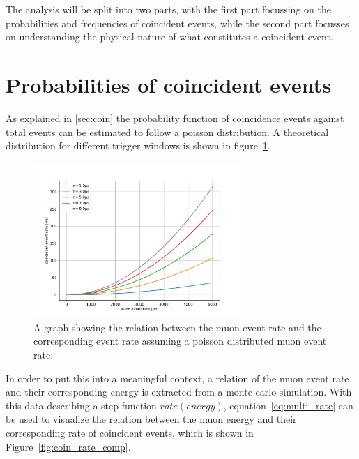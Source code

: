 The analysis will be split into two parts, with the first part focussing on the probabilities and frequencies of coincident events, while the second part 
focusses on understanding the physical nature of what constitutes a coincident event. 

\section{Probabilities of coincident events}

As explained in \ref{sec:coin} the probability function of coincidence events against total events can be estimated to follow a poisson distribution.
A theoretical distribution for different trigger windows is shown in figure~\ref{fig:coin_rate_rate}. 

\begin{figure}
    \centering
    \includegraphics[width=0.7\textwidth]{Plots/coincidence_rate_poisson.pdf}
    \caption{A graph showing the relation between the muon event rate and the corresponding event rate assuming a poisson distributed muon event rate.}
    \label{fig:coin_rate_rate}
\end{figure}

In order to put this into a meaningful context, a relation of the muon event rate and their corresponding energy is extracted from a monte carlo simulation.
With this data describing a step function $rate(energy)$, equation~\ref{eq:multi_rate} can be used to visualize the relation between the muon energy and their 
corresponding rate of coincident events, which is shown in Figure~\ref{fig:coin_rate_comp}.

